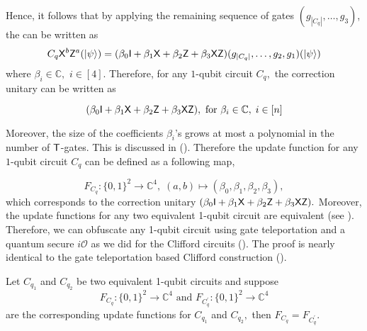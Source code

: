 Hence, it follows that by applying the remaining  sequence of gates $(g_{|C_q|},\ldots,g_3)$, the  can be written as
\begin{equation}
\begin{aligned}
\label{eq:pgate8}
C_q {\sf X}^b{\sf Z}^a ({\lvert}\psi\rangle)=(\beta_0 {\sf I} +  \beta_1 {\sf X} + \beta_2 {\sf Z} + \beta_3{\sf X} {\sf Z})(g_{|C_q|},\ldots,g_2,g_1 )({\lvert}\psi\rangle)
\end{aligned}
\end{equation}
where $\beta_i  \in \mathbb{C},$ $i\in[4].$  Therefore, for any  $1$-qubit circuit $C_q,$ the correction unitary can be written as

\begin{equation}
\label{eq:pgate9}
 (\beta_0 {\sf I} +   \beta_1 {\sf X} +  \beta_2 {\sf Z} +  \beta_3 {\sf X}{\sf Z}), \mbox{ for }  \beta_i \in \mathbb{C},\; i\in[n]
\end{equation}

Moreover, the size of the coefficients $\beta_i$'s grows at most a polynomial in the number of ${\sf T}$-gates. This is discussed in (). Therefore the update function for any $1$-qubit circuit $C_q$ can be defined as a following map,

\begin{equation*}
F_{C_q}:\{0,1\}^2\rightarrow \mathbb{C}^4,\; (a,b)\mapsto (\beta_0, \beta_1,\beta_2,\beta_3),
\end{equation*}
which corresponds to the correction unitary $(\beta_0 {\sf I} +  \beta_1 {\sf X} + \beta_2 {\sf Z} + \beta_3{\sf X} {\sf Z}).$
Moreover, the update functions for any two equivalent 1-qubit circuit are equivalent (see ). Therefore, we can obfuscate any 1-qubit circuit using gate teleportation and a quantum secure $i\mathcal{O}$ as we did for the Clifford circuits (). The proof is nearly identical to the gate teleportation based Clifford construction ().


\begin{lemma}
\label{lemma:1qubit}
Let $C_{q_1}$ and $C_{q_2}$ be two equivalent 1-qubit circuits and suppose
\begin{equation*}
F_{C_q}:\{0,1\}^2\rightarrow \mathbb{C}^4 \mbox{ and } F_{C_q^\prime}:\{0,1\}^2\rightarrow \mathbb{C}^4
\end{equation*}
are the corresponding update functions for $C_{q_1}$  and $C_{q_2},$   then $F_{C_q}=F_{C_q^\prime}.$
\end{lemma}

